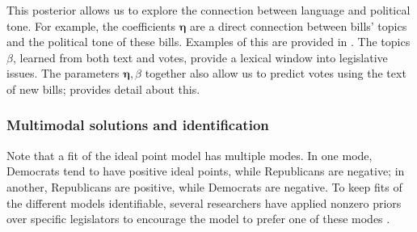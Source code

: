 This posterior allows us to explore the connection between language
and political tone.  For example, the coefficients $\bm \eta$ are a
direct connection between bills' topics and the political tone of
these bills. Examples of this are provided in .
The topics $\beta$, learned from both text and votes, provide a
lexical window into legislative issues.  The parameters $\bm \eta,
\beta$ together also allow us to predict votes using the text of new
bills;  provides detail about this.





\subsubsection*{Multimodal solutions and identification}
Note that a fit of the ideal point model has multiple modes.  In one
mode, Democrats tend to have positive ideal points, while Republicans
are negative; in another, Republicans are positive, while Democrats
are negative.  To keep fits of the different models identifiable,
several researchers have applied nonzero priors over specific
legislators to encourage the model to prefer one of these modes
\cite{jackman:2001,clinton:2004,martin:2002}.

